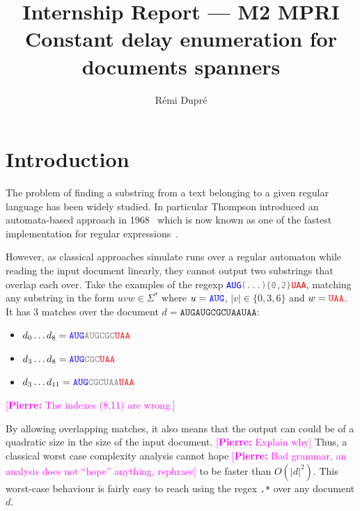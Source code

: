 \documentclass[12px]{article}
\title{%
  Internship Report --- M2 MPRI \\
  Constant delay enumeration for documents spanners
}
\author{Rémi Dupré}
\theoremstyle{definition}
\newcommand{\pierre}[1]{\textcolor{magenta}{[\textbf{Pierre:} #1]}}
\begin{document}
  \maketitle

  
  \pagebreak
  \tableofcontents
  \pagebreak

  \section{Introduction}

    The problem of finding a substring from a text belonging to a given
    regular language has been widely studied. In particular Thompson
    introduced an automata-based approach in
    1968~\cite{thompson1968programming} which is now known as one of the
    fastest implementation for regular expressions~\cite{cox2007regular}.

    However, as classical approaches simulate runs over a regular automaton
    while reading the input document linearly, they cannot output two
    substrings that overlap each over. Take the examples of the regexp
    \texttt{\textcolor{blue}{AUG}\textcolor{gray}{(...)\{0,2\}}\textcolor{red}{UAA}},
    matching any substring in the form $uvw \in \Sigma^*$ where $u =
    \texttt{\textcolor{blue}{AUG}}$, $|v| \in \{0, 3, 6\}$ and $w =
    \texttt{\textcolor{red}{UAA}}$. It has 3 matches over the document $d =
    \texttt{AUGAUGCGCUAAUAA}$:
      \begin{itemize}
        \item $d_0 \ldots d_8 =
          \texttt{\textcolor{blue}{AUG}\textcolor{gray}{AUGCGC}\textcolor{red}{UAA}}$
        \item $d_3 \ldots d_8 =
          \texttt{\textcolor{blue}{AUG}\textcolor{gray}{CGC}\textcolor{red}{UAA}}$
        \item $d_3 \ldots d_{11} =
          \texttt{\textcolor{blue}{AUG}\textcolor{gray}{CGCUAA}\textcolor{red}{UAA}}$
      \end{itemize}
      \pierre{The indexes (8,11) are wrong.}

    By allowing overlapping matches, it also means that the output can could be
    of a quadratic size in the size of the input document.
    \pierre{Explain why} Thus, a classical
    worst case complexity analysis cannot hope \pierre{Bad grammar, an
    analysis does not ``hope'' anything, rephrase} to be faster than $O(|d|^2)$.
    This worst-case behaviour is fairly easy to reach using the regex
    \texttt{.*} over any document $d$.
\end{document}
